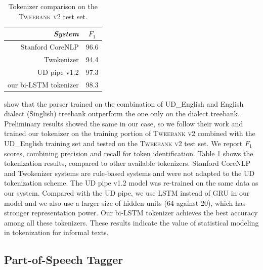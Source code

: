 \documentclass[11pt,a4paper]{article}
\newcommand{\yjcomment}[1]{\textcolor{orange}{[$_\mathrm{L}^\mathrm{Y}$#1]}}
\newcommand{\yicomment}[1]{\textcolor{gray}{[#1 ---\textsc{yi}]}}
\begin{document}
\begin{table}[t]
	\centering
	\begin{tabular}{rc}
		\hline
		\it System & $F_1$ \\
		\hline
		  Stanford CoreNLP & 96.6 \\
		 Twokenizer & 94.4 \\		 
		\hdashline
		UD pipe v1.2 & 97.3 \\
	 	our bi-LSTM tokenizer & 98.3 \\
		\hline
	\end{tabular}
	\caption{Tokenizer comparison on the \textsc{Tweebank v2} test set.}\label{tbl:tok-result}
\end{table}
\citet{wang-EtAl:2017:Long6} show that the parser trained 
on the combination of UD\_English and English dialect (Singlish) treebank
outperform the one only on the dialect treebank.  Preliminary results
showed the same in our case, so 
we follow their work and trained our tokenizer on the training portion of
\textsc{Tweebank v2} combined with the UD\_English training set
and tested on the \textsc{Tweebank v2} test set.%
We report $F_1$ scores, combining precision and recall for token identification. Table \ref{tbl:tok-result} shows the
tokenization results, compared to  other available tokenizers. 
 Stanford CoreNLP \cite{manning-EtAl:2014:P14-5} and Twokenizer
\cite{ICWSM101540} systems are rule-based systems and were not adapted
to the UD tokenization scheme.
The UD pipe v1.2
\cite{straka-strakova:2017:K17-3} model was re-trained on the same
data as our system. Compared with the UD pipe, we use LSTM
instead of GRU in our model and we also use a larger size of hidden units (64 against 20),
which has stronger representation power. 
Our bi-LSTM tokenizer achieves the best accuracy among all these
tokenizers.  These results indicate the value of statistical modeling
in tokenization for informal texts.

\subsection{Part-of-Speech Tagger}

\end{document}
